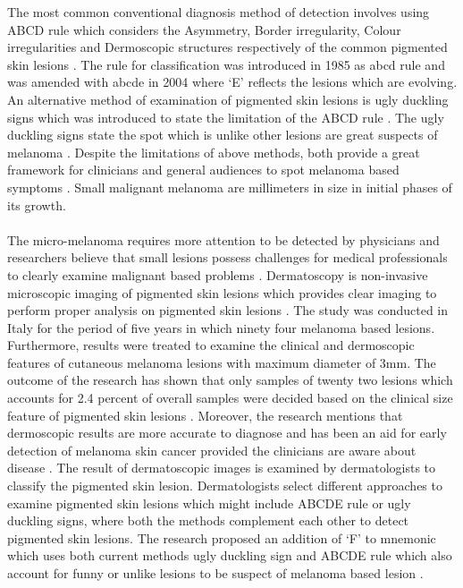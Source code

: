 The most common conventional diagnosis method of detection involves
using ABCD rule which considers the Asymmetry, Border irregularity,
Colour irregularities and  Dermoscopic structures respectively of the
common pigmented skin lesions \citep{LOESCHER2013170}. 
The rule for classification was introduced in 1985 as abcd 
rule and was amended with abcde in 2004 where ‘E’ reflects the 
lesions which are evolving. An alternative method of examination of
pigmented skin lesions is  ugly duckling signs which was introduced 
to state the limitation of the ABCD rule \citep{DanielJensen2015}.
The ugly duckling signs state the spot which is unlike other 
lesions are great suspects of melanoma \citep{grob1998ugly}.
Despite the limitations of above methods, both provide a great
framework for clinicians and general audiences to spot melanoma 
based symptoms \citep{DanielJensen2015}.
Small malignant melanoma are millimeters in size in initial phases
of its growth.  
\\
\\
The micro-melanoma requires more attention to be
detected by physicians and researchers believe that small 
lesions possess challenges for medical professionals to 
clearly examine malignant based problems \citep{doi:10.1177/030089160409000125}.
Dermatoscopy is non-invasive microscopic imaging of pigmented skin 
lesions which provides clear imaging to perform proper analysis on 
pigmented skin lesions \citep{LOESCHER2013170}. 
The study was conducted in Italy for the period of five years in 
which ninety four melanoma based lesions. Furthermore, results 
were treated to examine the clinical and dermoscopic features of 
cutaneous melanoma lesions with maximum diameter of 3mm. 
The outcome of the research has shown that only samples of twenty two lesions which 
accounts for 2.4 percent of overall samples were decided based on
the clinical size feature of pigmented skin lesions \citep{doi:10.1177/030089160409000125}.
Moreover, the research mentions that dermoscopic results are more accurate to diagnose 
and has been an aid for early detection of melanoma skin cancer 
provided the clinicians are aware about disease \citep{doi:10.1177/030089160409000125}.
The result of dermatoscopic images is examined by dermatologists to classify the pigmented skin lesion.
Dermatologists select different approaches to examine pigmented
skin lesions which might include ABCDE rule or ugly duckling signs, 
where both the methods complement each other to detect pigmented skin lesions. 
The research proposed an addition of ‘F’ to mnemonic which uses both 
current methods ugly duckling sign and ABCDE rule which also account 
for funny or unlike lesions to be suspect of melanoma based lesion \citep{doi:10.1177/030089160409000125}.
